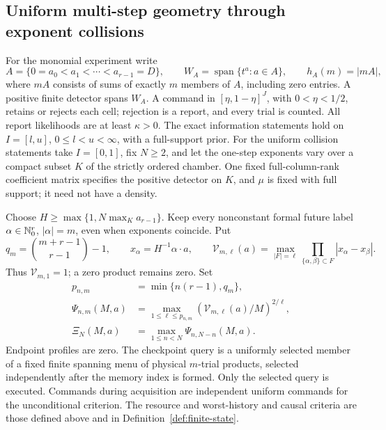 \documentclass[11pt]{amsart}
\theoremstyle{definition}\newtheorem{definition}[theorem]{Definition}
\theoremstyle{remark}\newtheorem{remark}[theorem]{Remark}
\begin{document}
\subsection{Uniform multi-step geometry through exponent collisions}
For the monomial experiment write
\[
 A=\{0=a_0<a_1<\cdots<a_{r-1}=D\},\qquad
 W_A=\operatorname{span}\{t^a:a\in A\},\qquad h_A(m)=|mA|,
\]
where $mA$ consists of sums of exactly $m$ members of $A$, including
zero entries. A positive finite detector spans $W_A$. A command in
$[\eta,1-\eta]^J$, with $0<\eta<1/2$, retains or rejects each cell;
rejection is a report, and every trial is counted. All report
likelihoods are at least $\kappa>0$. The exact information statements
hold on $I=[l,u]$, $0\le l<u<\infty$, with a full-support prior.
For the uniform collision statements take $I=[0,1]$, fix $N\ge2$,
and let the one-step exponents vary over a compact subset $K$ of the
strictly ordered chamber. One fixed full-column-rank coefficient matrix
specifies the positive detector on $K$, and $\mu$ is fixed with full
support; it need not have a density.

Choose $H\ge\max\{1,N\max_K a_{r-1}\}$. Keep every nonconstant
formal future label $\alpha\in\mathbb N_0^r$, $|\alpha|=m$, even when
exponents coincide. Put
\[
 q_m=\binom{m+r-1}{r-1}-1,\qquad x_\alpha=H^{-1}\alpha\cdot a,
 \qquad
 \mathcal V_{m,\ell}(a)=\max_{|F|=\ell}
       \prod_{\{\alpha,\beta\}\subset F}|x_\alpha-x_\beta|.
\]
Thus $\mathcal V_{m,1}=1$; a zero product remains zero. Set
\[
 \begin{split}
 p_{n,m}&=\min\{n(r-1),q_m\},\\
 \Psi_{n,m}(M,a)&=\max_{1\le\ell\le p_{n,m}}
       (\mathcal V_{m,\ell}(a)/M)^{2/\ell},\\
 \Xi_N(M,a)&=\max_{1\le n<N}\Psi_{n,N-n}(M,a).
 \end{split}
\]
Endpoint profiles are zero. The checkpoint query is a uniformly selected
member of a fixed finite spanning menu of physical $m$-trial products,
selected independently after the memory index is formed. Only the
selected query is executed. Commands during acquisition are independent
uniform commands for the unconditional criterion. The resource and
worst-history and causal criteria are those defined above and in
Definition~\ref{def:finite-state}.
\end{document}
